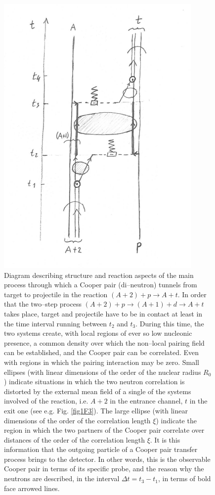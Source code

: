    \begin{figure}
    \centerline{\includegraphics*[width=10cm,angle=0]{C8/figsC8/fig6_5_5}}
    	\caption{Diagram describing structure and reaction aspects of the main process through which a Cooper pair (di--neutron) tunnels from target to projectile in the reaction $(A+2)+p\to A+t$. In order that the two--step process $(A+2)+p\to(A+1)+d\to A+t$ takes place, target and projectile have to be in contact at least in the time interval running between $t_2$ and $t_3$. During this time, the two systems create, with local regions of ever so low nucleonic presence, a common density over which the non--local pairing field can be established, and the Cooper pair can be correlated. Even with regions in which the pairing interaction may be zero. Small ellipses (with linear dimensions of the order of the nuclear radius $R_0$) indicate situations in which the two neutron correlation is distorted by the external mean field of a single of the systems involved of the reaction, i.e. $A+2$ in the entrance channel, $t$ in the exit one (see e.g. Fig. \ref{fig1F3}). The large ellipse (with linear dimensions of the order of the correlation length $\xi$) indicate the region in which the two partners of the Cooper pair correlate over distances of the order of the correlation length $\xi$. It is this information that the outgoing particle of a Cooper pair transfer process brings to the detector. In other words, this is the observable Cooper pair in terms of its specific probe, and the reason why the neutrons are described, in the interval $\Delta t=t_3-t_1$, in terms of bold face arrowed lines.}\label{fig6.5.5}
    \end{figure}
